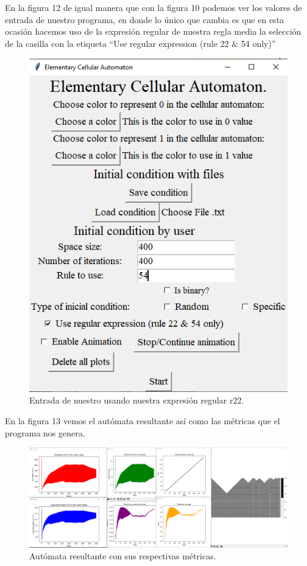 \documentclass[11pt]{article}
\begin{document}
		En la figura 12 de igual manera que con la figura 10 podemos ver los valores de entrada de nuestro programa, en donde lo único que cambia es que en esta ocasión hacemos uso de la expresión regular de nuestra regla media la selección de la casilla con la etiqueta ``Use regular expression (rule 22 \& 54 only)''
		\begin{figure}[H]
			\centering
			\includegraphics[scale=0.5]{resources/RegEx54/50_prob_regex_entrada.png}
			\caption{Entrada de nuestro usando nuestra expresión regular r22.}\label{fig:picture}
		\end{figure}
		En la figura 13 vemos el autómata resultante así como las métricas que el programa nos genera.
		\begin{figure}[H]
			\includegraphics[scale=0.26]{resources/RegEx54/random_regex_result.png}
			\caption{Autómata resultante con sus respectivas métricas.}\label{fig:picture}
		\end{figure}
\end{document}
